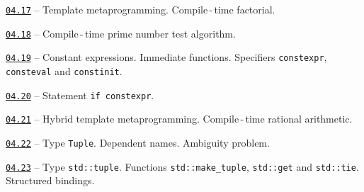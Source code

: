 \documentclass[a4paper,12pt]{article}
\renewenvironment{itemize}
{
    \begin{list}{\labelitemi}
    {
      \setlength{\topsep}{0pt}
      \setlength{\partopsep}{0pt}
      \setlength{\parskip}{0pt}
      \setlength{\itemsep}{0pt}
      \setlength{\parsep}{0pt}
      \setlength{\leftmargin}{14.5pt}
    }
}{\end{list}}
\begin{document}
\medskip\smallskip

\begin{itemize}

    \item \href{https://github.com/i-s-m-mipt/Education/blob/master/projects/examples/source/04.17.cpp}{\texttt{04.17}} -- Template metaprogramming. Compile\,-\,time factorial.

    \smallskip

    \item \href{https://github.com/i-s-m-mipt/Education/blob/master/projects/examples/source/04.18.cpp}{\texttt{04.18}} -- Compile\,-\,time prime number test algorithm.

    \smallskip

    \item \href{https://github.com/i-s-m-mipt/Education/blob/master/projects/examples/source/04.19.cpp}{\texttt{04.19}} -- Constant expressions. Immediate functions. Specifiers \lstinline{constexpr}, \lstinline{consteval} and \lstinline{constinit}.

    \smallskip

    \item \href{https://github.com/i-s-m-mipt/Education/blob/master/projects/examples/source/04.20.cpp}{\texttt{04.20}} -- Statement \lstinline{if constexpr}.

    \smallskip

    \item \href{https://github.com/i-s-m-mipt/Education/blob/master/projects/examples/source/04.21.cpp}{\texttt{04.21}} -- Hybrid template metaprogramming. Compile\,-\,time rational arithmetic.

    \smallskip

    \item \href{https://github.com/i-s-m-mipt/Education/blob/master/projects/examples/source/04.22.cpp}{\texttt{04.22}} -- Type \lstinline{Tuple}. Dependent names. Ambiguity problem.

    \smallskip

    \item \href{https://github.com/i-s-m-mipt/Education/blob/master/projects/examples/source/04.23.cpp}{\texttt{04.23}} -- Type \lstinline{std::tuple}. Functions \lstinline{std::make_tuple}, \lstinline{std::get} and \lstinline{std::tie}. Structured bindings.

\end{itemize}

\bigskip\medskip
\end{document}
